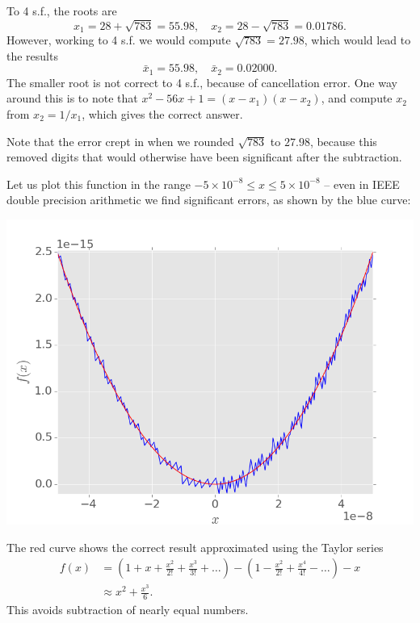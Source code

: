 \documentclass[
  letterpaper,
  DIV=11,
  numbers=noendperiod]{scrreprt}
\begin{document}
To 4 s.f., the roots are \[
x_1 = 28 + \sqrt{783} = 55.98, \quad x_2 = 28-\sqrt{783} = 0.01786.
\] However, working to 4 s.f. we would compute \(\sqrt{783} = 27.98\),
which would lead to the results \[
\bar{x}_1 = 55.98, \quad \bar{x}_2 = 0.02000.
\] The smaller root is not correct to 4 s.f., because of cancellation
error. One way around this is to note that
\(x^2 - 56x + 1 = (x-x_1)(x-x_2)\), and compute \(x_2\) from
\(x_2 = 1/x_1\), which gives the correct answer.

\begin{tcolorbox}[enhanced jigsaw, toptitle=1mm, breakable, colbacktitle=quarto-callout-note-color!10!white, colback=white, opacitybacktitle=0.6, rightrule=.15mm, bottomrule=.15mm, left=2mm, arc=.35mm, bottomtitle=1mm, title=\textcolor{quarto-callout-note-color}{\faInfo}\hspace{0.5em}{Note}, titlerule=0mm, toprule=.15mm, leftrule=.75mm, opacityback=0, colframe=quarto-callout-note-color-frame, coltitle=black]

Note that the error crept in when we rounded \(\sqrt{783}\) to
\(27.98\), because this removed digits that would otherwise have been
significant after the subtraction.

\end{tcolorbox}

Let us plot this function in the range
\(-5\times 10^{-8}\leq x \leq 5\times 10^{-8}\) -- even in IEEE double
precision arithmetic we find significant errors, as shown by the blue
curve:

\begin{center}
\includegraphics[width=0.7\linewidth,height=\textheight,keepaspectratio]{im/floating1.png}
\end{center}

The red curve shows the correct result approximated using the Taylor
series \[
\begin{aligned}
f(x) &= \left(1 + x + \frac{x^2}{2!} + \frac{x^3}{3!} + \ldots\right) - \left( 1 - \frac{x^2}{2!} + \frac{x^4}{4!} - \ldots\right) - x\\
&\approx x^2 + \frac{x^3}{6}.
\end{aligned}
\] This avoids subtraction of nearly equal numbers.
\end{document}
